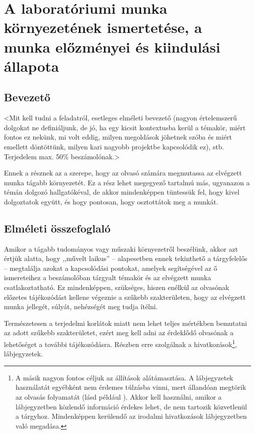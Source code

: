 \documentclass[a4paper,oneside]{article}
\begin{document}
\begin{titlepage}
 
  
 
\end{titlepage} 

\section{A laboratóriumi munka környezetének ismertetése,
     a munka előzményei és kiindulási állapota}
\label{sec:kornyezet}
\subsection{Bevezető}
\label{sec:bevezeto}

<Mit kell tudni a feladatról, esetleges elméleti bevezető (nagyon
értelemszerű dolgokat ne definiáljunk, de jó, ha egy kicsit
kontextusba kerül a témakör, miért fontos ez nekünk, mi volt eddig,
milyen megoldások jöhetnek szóba és miért emellett döntöttünk, milyen
kari nagyobb projektbe kapcsolódik ez), stb. Terjedelem max. 50\%
beszámolónak.>

Ennek a résznek az a szerepe, hogy az olvasó számára megmutassa az
elvégzett munka tágabb környezetét. Ez a rész lehet megegyező tartalmú
más, ugyanazon a témán dolgozó hallgatókéval, de akkor mindenképpen
tüntessük fel, hogy kivel dolgoztatok együtt, és hogy pontosan, hogy
osztottátok meg a munkát.

\subsection{Elméleti összefoglaló}

Amikor a tágabb tudományos vagy műszaki környezetről beszélünk, akkor
azt értjük alatta, hogy ,,művelt laikus'' -- alapesetben ennek
tekinthető a tárgyfelelős -- megtalálja azokat a kapcsolódási
pontokat, amelyek segítségével az ő ismereteihez a beszámolóban
tárgyalt témakör és az elvégzett munka csatlakoztatható.  Ez
mindenképpen, szükséges, hiszen enélkül az olvasónak előzetes
tájékozódást kellene végeznie a szűkebb szakterületen, hogy az
elvégzett munka jellegét, súlyát, nehézségét meg tudja ítélni.

Természetesen a terjedelmi korlátok miatt nem lehet teljes mértékben
bemutatni az adott szűkebb szakterületet, ezért meg kell adni az
érdeklődő olvasónak a lehetőséget a további tájékozódásra.  Részben
erre szolgálnak a hivatkozások\footnote{A másik nagyon fontos céljuk
  az állítások alátámasztása.  A lábjegyzetek használatát egyébként
  nem érdemes túlzásba vinni, mert állandóan megtörik az olvasás
  folyamatát (lásd például \cite{esterhazy}).  Akkor kell használni,
  amikor a lábjegyzetben közlendő információ érdekes lehet, de nem
  tartozik közvetlenül a tárgyhoz.  Mindenképpen kerülendő az irodalmi
  hivatkozások lábjegyzetben való megadása.}, lábjegyzetek.
\end{document}
